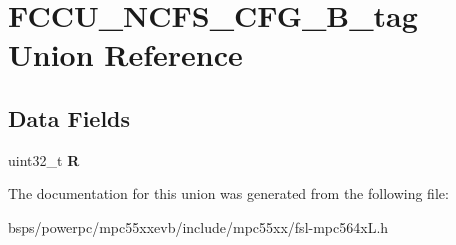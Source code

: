 \hypertarget{unionFCCU__NCFS__CFG__32B__tag}{}\section{F\+C\+C\+U\+\_\+\+N\+C\+F\+S\+\_\+\+C\+F\+G\+\_\+B\+\_\+tag Union Reference}
\label{unionFCCU__NCFS__CFG__32B__tag}
\subsection*{Data Fields}
\begin{DoxyCompactItemize}
\item 
\mbox{\label{unionFCCU__NCFS__CFG__32B__tag_a341766d4f43d9be5e4d100f92474c1d9}} 
uint32\+\_\+t {\bfseries R}
\end{DoxyCompactItemize}


The documentation for this union was generated from the following file\+:\begin{DoxyCompactItemize}
\item 
bsps/powerpc/mpc55xxevb/include/mpc55xx/fsl-\/mpc564x\+L.\+h\end{DoxyCompactItemize}
